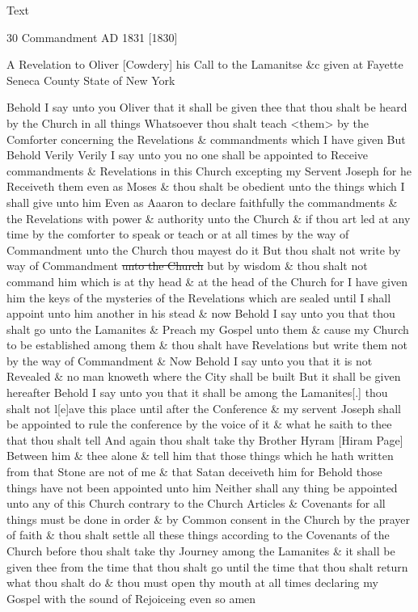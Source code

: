 			\begin{description}
				\item[Text]
			\end{description}
			
				\begin{tightcenter}
				30 Commandment AD 1831 [1830]
				\end{tightcenter}
				
				A Revelation to Oliver [Cowdery] his Call to the Lamanitse \&c given at Fayette Seneca County State of New York
				
				Behold I say unto you Oliver that it shall be given thee that thou shalt be heard by the Church in all things Whatsoever thou shalt teach <them> by the Comforter concerning the Revelations \& commandments which I have given But Behold Verily Verily I say unto you no one shall be appointed to Receive commandments \& Revelations in this Church excepting my Servent Joseph for he Receiveth them even as Moses \& thou shalt be obedient unto the things which I shall give unto him Even as Aaaron to declare faithfully the commandments \& the Revelations with power \& authority unto the Church \& if thou art led at any time by the comforter to speak or teach or at all times by the way of Commandment unto the Church thou mayest do it But thou shalt not write by way of Commandment \sout{unto the Church} but by wisdom \& thou shalt not command him which is at thy head \& at the head of the Church for I have given him the keys of the mysteries of the Revelations which are sealed until I shall appoint unto him another in his stead \& now Behold I say unto you that thou shalt go unto the Lamanites \& Preach my Gospel unto them \& cause my Church to be established among them \& thou shalt have Revelations but write them not by the way of Commandment \& Now Behold I say unto you that it is not Revealed \& no man knoweth where the City shall be built But it shall be given hereafter Behold I say unto you that it shall be among the Lamanites[.] thou shalt not l[e]ave this place until after the Conference \& my servent Joseph shall be appointed to rule the conference by the voice of it \& what he saith to thee that thou shalt tell And again thou shalt take thy Brother Hyram [Hiram Page] Between him \& thee alone \& tell him that those things which he hath written from that Stone are not of me \& that Satan deceiveth him for Behold those things have not been appointed unto him Neither shall any thing be appointed unto any of this Church contrary to the Church Articles \& Covenants for all things must be done in order \& by Common consent in the Church by the prayer of faith \& thou shalt settle all these things according to the Covenants of the Church before thou shalt take thy Journey among the Lamanites \& it shall be given thee from the time that thou shalt go until the time that thou shalt return what thou shalt do \& thou must open thy mouth at all times declaring my Gospel with the sound of Rejoiceing even so amen
				
